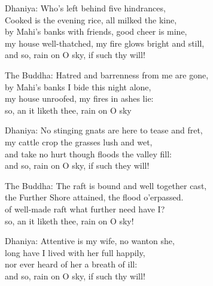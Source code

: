    \begin{MyDescription}{Dhaniya:}
      	Who's left behind five hindrances,\\
      	   		Cooked is the evening rice, all milked the kine,\\
      	   		   			by Mahi's banks with friends, good cheer is mine,\\
      	   		   			my house well-thatched, my fire glows bright and still,\\
      	   		   			and so, rain on O sky, if such thy will!
         \end{MyDescription} 

 \begin{MyDescription}{The Buddha:}
Hatred and barrenness from me are gone,\\
by Mahi's banks I bide this night alone,\\
my house unroofed, my fires in ashes lie:\\
so, an it liketh thee, rain on O sky
         \end{MyDescription} 


 \begin{MyDescription}{Dhaniya:}
No stinging gnats are here to tease and fret,\\
my cattle crop the grasses lush and wet,\\
and take no hurt though floods the valley fill:\\
and so, rain on O sky, if such they will!
         \end{MyDescription} 


 \begin{MyDescription}{The Buddha:}
The raft is bound and well together cast,\\
the Further Shore attained, the flood o'erpassed.\\
of well-made raft what further need have I?\\
so, an it liketh thee, rain on O sky!
         \end{MyDescription} 
  \begin{MyDescription}{Dhaniya:}
Attentive is my wife, no wanton she,\\
long have I lived with her full happily,\\
nor ever heard of her a breath of ill:\\
and so, rain on O sky, if such thy will!
          \end{MyDescription} 

